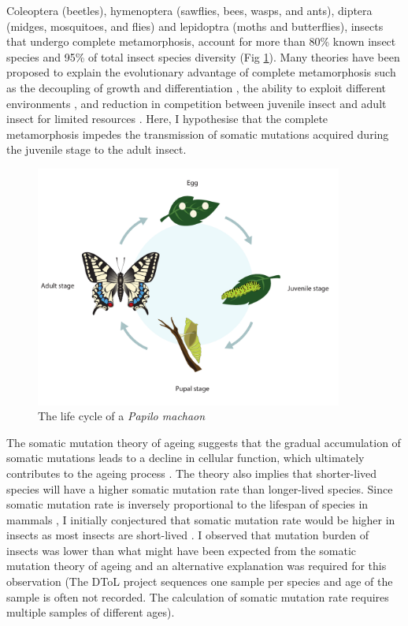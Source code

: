 Coleoptera (beetles), hymenoptera (sawflies, bees, wasps, and ants), diptera (midges, mosquitoes, and flies) and lepidoptra (moths and butterflies), insects that undergo complete metamorphosis, account for more than 80\% known insect species and 95\% of total insect species diversity (Fig \ref{figure:papilo-machaon}). Many theories have been proposed to explain the evolutionary advantage of complete metamorphosis such as the decoupling of growth and differentiation \cite{Rolff2019-ef}, the ability to exploit different environments \cite{Darwin1859}, and reduction in competition between juvenile insect and adult insect for limited resources \cite{Ebenman1992-in}. Here, I hypothesise that the complete metamorphosis impedes the transmission of somatic mutations acquired during the juvenile stage to the adult insect.

\begin{figure}[h!]
\caption{The life cycle of a \textit{Papilo machaon}}
\label{figure:papilo-machaon}
\begin{centering}
\includegraphics[width=0.9\textwidth]{papilo_machaon_life_cycle.pdf} 
\end{centering}
\end{figure}

The somatic mutation theory of ageing suggests that the gradual accumulation of somatic mutations leads to a decline in cellular function, which ultimately contributes to the ageing process \cite{Szilard1959-ru}. The theory also implies that shorter-lived species will have a higher somatic mutation rate than longer-lived species. Since somatic mutation rate is inversely proportional to the lifespan of species in mammals \cite{Cagan2022-yn}, I initially conjectured that somatic mutation rate would be higher in insects as most insects are short-lived \cite{Promislow2022-en}. I observed that mutation burden of insects was lower than what might have been expected from the somatic mutation theory of ageing and an alternative explanation was required for this observation (The DToL project sequences one sample per species and age of the sample is often not recorded. The calculation of somatic mutation rate requires multiple samples of different ages). 

